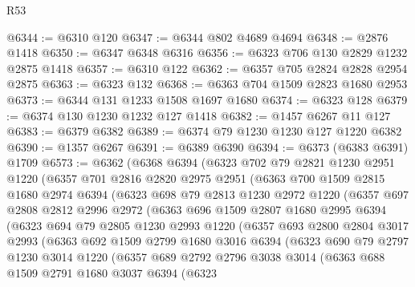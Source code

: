 \begin{lexlean}{R53}
\begin{coremodule}
@6344 := @6310 @120
@6347 := @6344 @802 @4689 @4694
@6348 := @2876 @1418
@6350 := @6347 @6348 @6316
@6356 := @6323 @706 @130 @2829 @1232 @2875 @1418
@6357 := @6310 @122
@6362 := @6357 @705 @2824 @2828 @2954 @2875
@6363 := @6323 @132
@6368 := @6363 @704 @1509 @2823 @1680 @2953
@6373 := @6344 @131 @1233 @1508 @1697 @1680
@6374 := @6323 @128
@6379 := @6374 @130 @1230 @1232 @127 @1418
@6382 := @1457 @6267 @11 @127
@6383 := @6379 @6382
@6389 := @6374 @79 @1230 @1230 @127 @1220 @6382
@6390 := @1357 @6267
@6391 := @6389 @6390
@6394 := @6373 (@6383 @6391) @1709
@6573 := @6362
    (@6368
      @6394
      (@6323
        @702
        @79
        @2821
        @1230
        @2951
        @1220
        (@6357
          @701
          @2816
          @2820
          @2975
          @2951
          (@6363
            @700
            @1509
            @2815
            @1680
            @2974
            @6394
            (@6323
              @698
              @79
              @2813
              @1230
              @2972
              @1220
              (@6357
                @697
                @2808
                @2812
                @2996
                @2972
                (@6363
                  @696
                  @1509
                  @2807
                  @1680
                  @2995
                  @6394
                  (@6323
                    @694
                    @79
                    @2805
                    @1230
                    @2993
                    @1220
                    (@6357
                      @693
                      @2800
                      @2804
                      @3017
                      @2993
                      (@6363
                        @692
                        @1509
                        @2799
                        @1680
                        @3016
                        @6394
                        (@6323
                          @690
                          @79
                          @2797
                          @1230
                          @3014
                          @1220
                          (@6357
                            @689
                            @2792
                            @2796
                            @3038
                            @3014
                            (@6363
                              @688
                              @1509
                              @2791
                              @1680
                              @3037
                              @6394
                              (@6323

\end{coremodule}
\end{lexlean}
